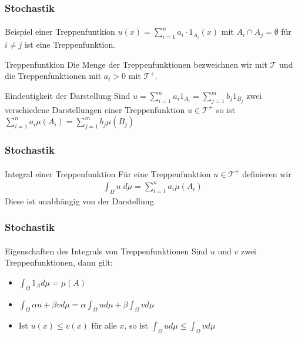 \documentclass{beamer}
\begin{document}
\begin{frame}
    \frametitle{Stochastik}
\framesubtitle{}

    \begin{block}{Beispiel  einer Treppenfuntkion}
         $u(x) = \sum_{i= 1}^n a_i \cdot  1_{A_i}(x)$ mit $A_i \cap A_j = \emptyset$ für $i \neq j$ ist eine Treppenfunktion.
    \end{block}

    \begin{block}{Treppenfuntkion}
        Die Menge der Treppenfunktionen bezweichnen wir mit $\mathcal{T}$ und die Treppenfunktionen mit $a_i > 0$ mit $\mathcal{T}^+$.        
    \end{block}
    
    \begin{block}{Eindeutigkeit der Darstellung}
        Sind $u = \sum_{i= 1}^n a_i 1_{A_i} = \sum_{j= 1}^m b_j 1_{B_j}$ zwei verschiedene Darstellungen einer Treppenfunktion 
        $u \in \mathcal{T}^+$
        so ist $\sum_{i= 1}^n a_i \mu (A_i) = \sum_{j= 1}^m b_j \mu (B_j)$
    \end{block}




\end{frame}


\begin{frame}
    \frametitle{Stochastik}
\framesubtitle{}
    \begin{block}{Integral einer Treppenfunktion}
        Für eine Treppenfunktion $u \in \mathcal{T}^+$ definieren wir
\begin{align*}
    \int_\Omega u \; d\mu= \sum_{i=1}^n a_i \mu(A_i)
\end{align*}
Diese ist unabhängig von der Darstellung.
    \end{block}

\end{frame}


\begin{frame}
    \frametitle{Stochastik}
\framesubtitle{}
\begin{block}{Eigenschaften des Integrals von Treppenfunktionen}
    Sind $u$ und $v$ zwei Treppenfunktionen, dann gilt:
    \begin{itemize}
    \item $\int_{\Omega} 1_A  d\mu  = \mu (A)$  
    \item $\int_{\Omega} \alpha u  + \beta v d\mu = \alpha \int_{\Omega}  u d\mu + \beta  \int_{\Omega}  v d\mu$
    \item Ist $u(x) \leq v(x)$ für alle $x$, so ist $\int_{\Omega} u d\mu \leq \int_{\Omega} v d\mu$ 
    \end{itemize}
    \end{block}
\end{frame}
\end{document}
